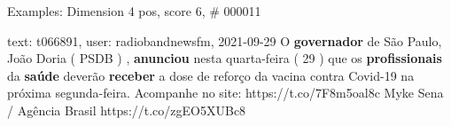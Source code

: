 \begin{frame}{Examples: Dimension 4 pos, score 6, \# 000011}
\footnotesize
\begin{exampleblock}{text: t066891, user: radiobandnewsfm, 2021-09-29}
O \textbf{governador} de São Paulo, João Doria ( PSDB ) , \textbf{anunciou} 
nesta quarta-feira ( 29 ) que os \textbf{profissionais} da \textbf{saúde} 
deverão \textbf{receber} a dose de reforço da vacina contra Covid-19 na próxima 
segunda-feira. Acompanhe no site: https://t.co/7F8m5oal8c  Myke 
Sena / Agência Brasil https://t.co/zgEO5XUBc8 
\end{exampleblock}
\end{frame}
